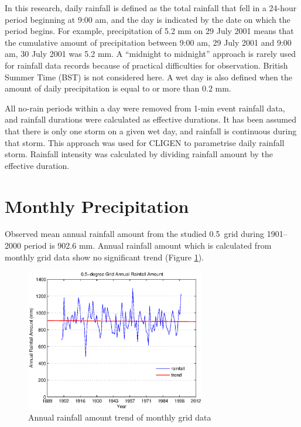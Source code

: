 In this research, daily rainfall is defined as the total rainfall that fell in a
24-hour period beginning at 9:00 am, and the day is indicated by the date on
which the period begins. For example, precipitation of 5.2 mm on 29 July 2001
means that the cumulative amount of precipitation between 9:00 am, 29 July 2001
and 9:00 am, 30 July 2001 was 5.2 mm. A ``midnight to midnight'' approach is
rarely used for rainfall data records because of practical difficulties for
observation. British Summer Time (BST) is not considered here. A wet day is also
defined when the amount of daily precipitation is equal to or more than 0.2 mm.

All no-rain periods within a day were removed from 1-min event rainfall data,
and rainfall durations were calculated as effective durations. It has been
assumed that there is only one storm on a given wet day, and rainfall is
continuous during that storm. This approach was used for CLIGEN to parametrise
daily rainfall storm. Rainfall intensity was calculated by dividing rainfall
amount by the effective duration.

\section{Monthly Precipitation}
\label{sec:HalfDegreeGridMonthlyPrecipitationData}

Observed mean annual rainfall amount from the studied 0.5\textdegree\ grid
during 1901--2000 period is 902.6 mm.
Annual rainfall amount which is calculated from monthly grid data show no
significant trend (Figure \ref{fig:grid_annual_amount}).

\begin{figure}[htbp]
  \centering
    \includegraphics[width=0.7\textwidth]{./img/grid_annual_amount}
  \caption{Annual rainfall amount trend of monthly grid data}
  \label{fig:grid_annual_amount}
\end{figure}

